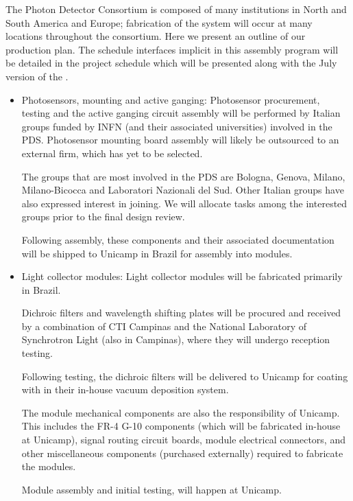 The Photon Detector Consortium is composed of many institutions in North and South America and Europe; fabrication of the system will occur at many locations throughout the consortium.  Here we present an outline of our production plan.  The schedule interfaces implicit in this assembly program will be detailed in the project schedule which will be presented along with the July version of the .

\begin{itemize}

\item Photosensors, mounting and active ganging:  Photosensor procurement, testing and the active ganging circuit assembly will be performed by Italian groups funded by INFN (and their associated universities) involved in the PDS. Photosensor mounting board assembly will likely be outsourced to an external firm, which has yet to be selected.

The groups that are most involved in the PDS are Bologna, Genova, Milano, Milano-Bicocca and Laboratori Nazionali del Sud.  Other Italian groups have also expressed interest in joining.  We will allocate tasks among the interested groups prior to the final design review.

Following assembly, these components and their associated  documentation will be shipped to Unicamp in Brazil for assembly into  modules.

\item Light collector modules:  Light collector modules will be fabricated primarily in Brazil.  

Dichroic filters and wavelength shifting plates will be procured and received by a combination of CTI Campinas and the National Laboratory of Synchrotron Light (also in Campinas), where they will undergo reception  testing.

Following testing, the dichroic filters will be delivered to Unicamp for coating with  in their in-house vacuum deposition system.

The module mechanical components are also the responsibility of Unicamp.  This includes the FR-4 G-10 components (which will be fabricated in-house at Unicamp), signal routing circuit boards, module electrical connectors, and other miscellaneous components (purchased externally) required to fabricate the modules.

Module assembly and initial  testing, will happen at Unicamp.


\end{itemize}
